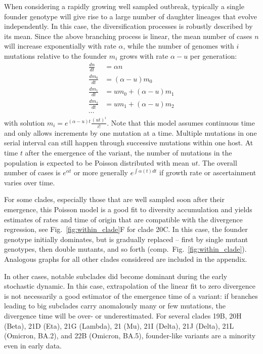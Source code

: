 \documentclass[aps,rmp, twocolumn]{revtex4}
\begin{document}
When considering a rapidly growing well sampled outbreak, typically a single founder genotype will give rise to a large number of daughter lineages that evolve independently.
In this case, the diversification processes is robustly described by its mean.
Since the above branching process is linear, the mean number of cases $n$ will increase exponentially with rate $\alpha$, while the number of genomes with $i$ mutations relative to the founder $m_i$ grows with rate $\alpha - u$ per generation:
\begin{equation}
    \begin{split}
        \frac{dn}{dt} &= \alpha n \\
        \frac{dm_0}{dt} &= (\alpha - u) m_0 \\
        \frac{dm_1}{dt} &= u m_0 + (\alpha - u) m_1 \\
        \frac{dm_2}{dt} &= u m_1 + (\alpha - u) m_2 \\
        \cdots
    \end{split}
\end{equation}
with solution $m_i = e^{(\alpha - u)t} \frac{(ut)^i}{i!}$.
Note that this model assumes continuous time and only allows increments by one mutation at a time.
Multiple mutations in one serial interval can still happen through successive mutations within one host.
At time $t$ after the emergence of the variant, the number of mutations in the population is expected to be Poisson distributed with mean $ut$.
The overall number of cases is $e^{\alpha t}$ or more generally $e^{\int \alpha(t) dt}$ if growth rate or ascertainment varies over time.

For some clades, especially those that are well sampled soon after their emergence, this Poisson model is a good fit to diversity accumulation and yields estimates of rates and time of origin that are compatible with the divergence regression, see Fig.~\ref{fig:within_clade}F for clade 20C.
In this case, the founder genotype initially dominates, but is gradually replaced -- first by single mutant genotypes, then double mutants, and so forth (comp.~Fig.~\ref{fig:within_clade}).
Analogous graphs for all other clades considered are included in the appendix.

In other cases, notable subclades did become dominant during the early stochastic dynamic.
In this case, extrapolation of the linear fit to zero divergence is not necessarily a good estimator of the emergence time of a variant: if branches leading to big subclades carry anomalously many or few mutations, the divergence time will be over- or underestimated.
For several clades 19B, 20H (Beta), 21D (Eta), 21G (Lambda), 21 (Mu), 21I (Delta), 21J (Delta), 21L (Omicron, BA.2), and 22B (Omicron, BA.5), founder-like variants are a minority even in early data.
\end{document}
